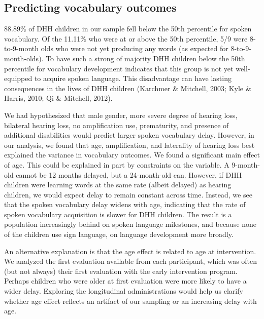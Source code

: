 \documentclass[english,man]{apa6}
\begin{document}
\hypertarget{predicting-vocabulary-outcomes}{%
\subsection{Predicting vocabulary outcomes}\label{predicting-vocabulary-outcomes}}

88.89\% of DHH children in our sample fell below the 50th percentile for spoken vocabulary. Of the 11.11\% who were at or above the 50th percentile, 5/9 were 8-to-9-month olds who were not yet producing any words (as expected for 8-to-9-month-olds). To have such a strong of majority DHH children below the 50th percentile for vocabulary development indicates that this group is not yet well-equipped to acquire spoken language. This disadvantage can have lasting consequences in the lives of DHH children (Karchmer \& Mitchell, 2003; Kyle \& Harris, 2010; Qi \& Mitchell, 2012).

We had hypothesized that male gender, more severe degree of hearing loss, bilateral hearing loss, no amplification use, prematurity, and presence of additional disabilities would predict larger spoken vocabulary delay. However, in our analysis, we found that age, amplification, and laterality of hearing loss best explained the variance in vocabulary outcomes. We found a significant main effect of age. This could be explained in part by constraints on the variable. A 9-month-old cannot be 12 months delayed, but a 24-month-old can. However, if DHH children were learning words at the same rate (albeit delayed) as hearing children, we would expect delay to remain constant across time. Instead, we see that the spoken vocabulary delay widens with age, indicating that the rate of spoken vocabulary acquisition is slower for DHH children. The result is a population increasingly behind on spoken language milestones, and because none of the children use sign language, on language development more broadly.

An alternative explanation is that the age effect is related to age at intervention. We analyzed the first evaluation available from each participant, which was often (but not always) their first evaluation with the early intervention program. Perhaps children who were older at first evaluation were more likely to have a wider delay. Exploring the longitudinal administrations would help us clarify whether age effect reflects an artifact of our sampling or an increasing delay with age.
\end{document}
